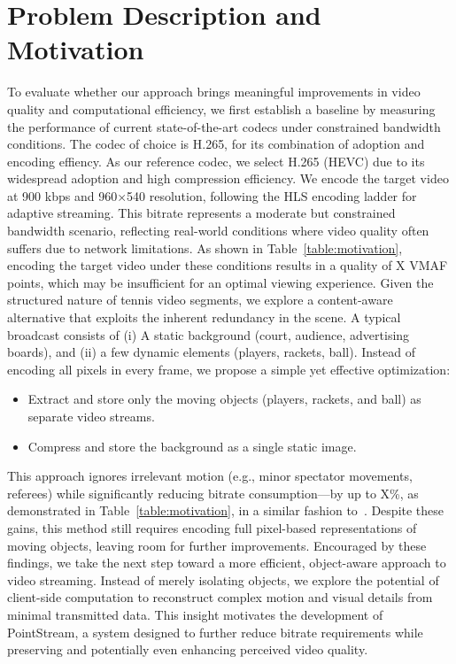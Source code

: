 \documentclass[sigconf, screen, review, anonymous]{acmart}
\begin{document}
\section{Problem Description and Motivation}
To evaluate whether our approach brings meaningful improvements in video quality and computational efficiency, we first establish a baseline by measuring the performance of current state-of-the-art codecs under constrained bandwidth conditions.
The codec of choice is H.265, for its combination of adoption and encoding effiency.
As our reference codec, we select H.265 (HEVC) due to its widespread adoption and high compression efficiency. We encode the target video at 900 kbps and 960×540 resolution, following the HLS encoding ladder for adaptive streaming. This bitrate represents a moderate but constrained bandwidth scenario, reflecting real-world conditions where video quality often suffers due to network limitations. As shown in Table~\ref{table:motivation}, encoding the target video under these conditions results in a quality of X VMAF points, which may be insufficient for an optimal viewing experience.
Given the structured nature of tennis video segments, we explore a content-aware alternative that exploits the inherent redundancy in the scene. A typical broadcast consists of (i) A static background (court, audience, advertising boards), and (ii) a few dynamic elements (players, rackets, ball).
Instead of encoding all pixels in every frame, we propose a simple yet effective optimization:
\begin{itemize}
    \item Extract and store only the moving objects (players, rackets, and ball) as separate video streams.
    \item Compress and store the background as a single static image.
\end{itemize}
This approach ignores irrelevant motion (e.g., minor spectator movements, referees) while significantly reducing bitrate consumption—by up to X\%, as demonstrated in Table~\ref{table:motivation}, in a similar fashion to~\cite{elvis}. Despite these gains, this method still requires encoding full pixel-based representations of moving objects, leaving room for further improvements.
Encouraged by these findings, we take the next step toward a more efficient, object-aware approach to video streaming. Instead of merely isolating objects, we explore the potential of client-side computation to reconstruct complex motion and visual details from minimal transmitted data. This insight motivates the development of PointStream, a system designed to further reduce bitrate requirements while preserving and potentially even enhancing perceived video quality.
\end{document}
